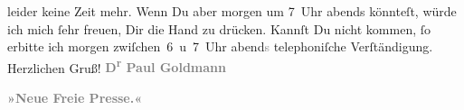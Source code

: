                leider keine Zeit mehr. Wenn Du {\pb}aber morgen um 7 Uhr{ }\introOben{}abends\introOben{}{ }\label{K_L03234-2v}\label{K_L03234-2} könnteſt, würde ich mich{ }ſehr
               freuen, Dir die Hand zu drücken. Kannſt Du nicht kommen,{ }ſo erbitte ich morgen{ }zwiſchen 6 u 7 Uhr abend\textcolor{gray}{s} telephoniſche Verſtändigung.\pend
           \pstart Herzlichen Gruß!\pend{}
\pstart
           \centering{}\textcolor{gray}{\textbf{D\textsuperscript{r} Paul Goldmann}}\pend
           
\pstart
           \raggedleft{}\textcolor{gray}{\textbf{»Neue Freie Presse.«}}\pend
           \endnumbering{}  \newcommand{\dateiname}{L03234}\newcommand{\titel}{Paul Goldmann an Arthur Schnitzler, 20. 11. [1905]}\newcommand{\editorInnen}{Martin Anton Müller und Laura Untner}
